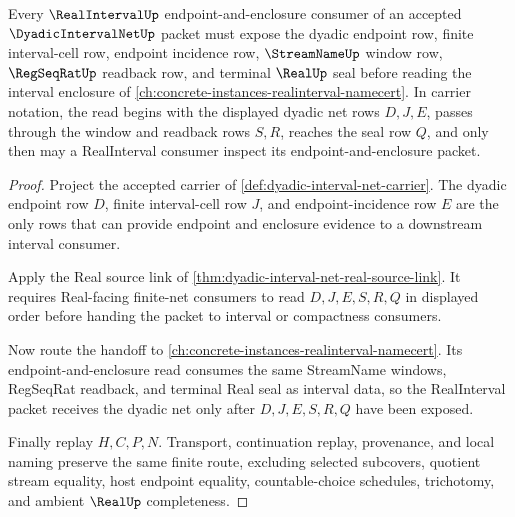 \begin{theorem}
\label{thm:dyadic-interval-net-realinterval-orphan-route}
Every $\RealIntervalUp$ endpoint-and-enclosure consumer of an accepted $\DyadicIntervalNetUp$ packet must expose the dyadic endpoint row, finite interval-cell row, endpoint incidence row, $\StreamNameUp$ window row, $\RegSeqRatUp$ readback row, and terminal $\RealUp$ seal before reading the interval enclosure of \autoref{ch:concrete-instances-realinterval-namecert}. In carrier notation, the read begins with the displayed dyadic net rows $D,J,E$, passes through the window and readback rows $S,R$, reaches the seal row $Q$, and only then may a RealInterval consumer inspect its endpoint-and-enclosure packet.
\end{theorem}
\begin{proof}
Project the accepted carrier of \autoref{def:dyadic-interval-net-carrier}. The dyadic endpoint row $D$, finite interval-cell row $J$, and endpoint-incidence row $E$ are the only rows that can provide endpoint and enclosure evidence to a downstream interval consumer.

Apply the Real source link of \autoref{thm:dyadic-interval-net-real-source-link}. It requires Real-facing finite-net consumers to read $D,J,E,S,R,Q$ in displayed order before handing the packet to interval or compactness consumers.

Now route the handoff to \autoref{ch:concrete-instances-realinterval-namecert}. Its endpoint-and-enclosure read consumes the same StreamName windows, RegSeqRat readback, and terminal Real seal as interval data, so the RealInterval packet receives the dyadic net only after $D,J,E,S,R,Q$ have been exposed.

Finally replay $H,C,P,N$. Transport, continuation replay, provenance, and local naming preserve the same finite route, excluding selected subcovers, quotient stream equality, host endpoint equality, countable-choice schedules, trichotomy, and ambient $\RealUp$ completeness.
\end{proof}
